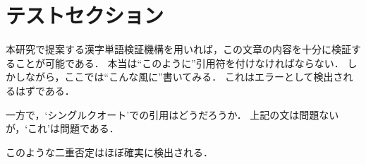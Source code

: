 \section{テストセクション}

本研究で提案する漢字単語検証機構を用いれば，この文章の内容を十分に検証することが可能である．
本当は``このように''引用符を付けなければならない．
しかしながら，ここでは“こんな風に”書いてみる．
これはエラーとして検出されるはずである．

一方で，`シングルクオート'での引用はどうだろうか．
上記の文は問題ないが，‘これ’は問題である．

このような二重否定はほぼ確実に検出される．
